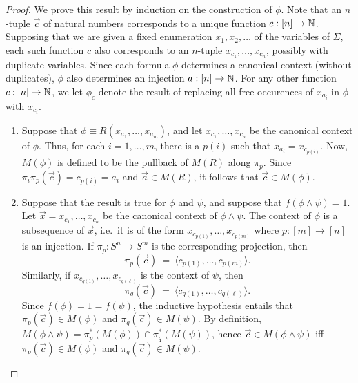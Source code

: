 \begin{proof} We prove this result by induction on the construction of
  $\phi$.  Note that an $n$-tuple $\vec{c}$ of natural numbers
  corresponds to a unique function $c:[n]\to \mathbb N$.  Supposing that we
  are given a fixed enumeration $x_1,x_2,\dots $ of the variables of
  $\Sigma$, each such function $c$ also corresponds to an $n$-tuple
  $x_{c_1},\dots ,x_{c_n}$, possibly with duplicate variables.  Since
  each formula $\phi$ determines a canonical context (without
  duplicates), $\phi$ also determines an injection $a:[n]\to\mathbb N$.  For
  any other function $c:[n]\to\mathbb N$, we let $\phi _c$ denote the result
  of replacing all free occurences of $x_{a_i}$ in $\phi$ with
  $x_{c_i}$.
  \begin{enumerate}
  \item Suppose that $\phi\equiv R(x_{a_1},\dots ,x_{a_m})$, and let
    $x_{c_1},\dots ,x_{c_n}$ be the canonical context of $\phi$.
    Thus, for each $i=1,\dots ,m$, there is a $p(i)$ such that
    $x_{a_i}=x_{c_{p(i)}}$.  Now, $M(\phi )$ is defined to be the
    pullback of $M(R)$ along $\pi _p$.  Since
    $\pi _i\pi _p(\vec{c})=c_{p(i)}=a_i$ and $\vec{a}\in M(R)$, it
    follows that $\vec{c}\in M(\phi )$.


  \item Suppose that the result is true for $\phi$ and $\psi$, and
    suppose that $f(\phi\wedge\psi )=1$.  Let
    $\vec{x}=x_{c_1},\dots ,x_{c_n}$ be the canonical context of
    $\phi\wedge\psi$.  The context of $\phi$ is a subsequence of
    $\vec{x}$, i.e.\ it is of the form
    $x_{c_{p(1)}},\dots ,x_{c_{p(m)}}$ where $p:[m]\to [n]$ is an
    injection.  If $\pi _p:S^n\to S^m$ is the corresponding
    projection, then
    \[ \pi _p(\vec{c}) \: = \: \langle c_{p(1)},\dots ,c_{p(m)}\rangle
      .\] Similarly, if $x_{c_{q(1)}},\dots ,x_{c_{q(\ell )}}$ is the
    context of $\psi$, then
    \[ \pi _q(\vec{c}) \: = \: \langle c_{q(1)},\dots ,c_{q(\ell
        )}\rangle .\] Since $f(\phi )=1=f(\psi )$, the inductive
    hypothesis entails that $\pi _p(\vec{c})\in M(\phi )$ and
    $\pi _q(\vec{c})\in M(\psi )$.  By definition,
    $M(\phi\wedge\psi )=\pi _p^*(M(\phi ))\cap \pi _q^*(M(\psi ))$,
    hence $\vec{c}\in M(\phi\wedge\psi )$ iff
    $\pi _p(\vec{c})\in M(\phi )$ and $\pi _q(\vec{c})\in M(\psi )$.
     


\end{enumerate}
\end{proof}
